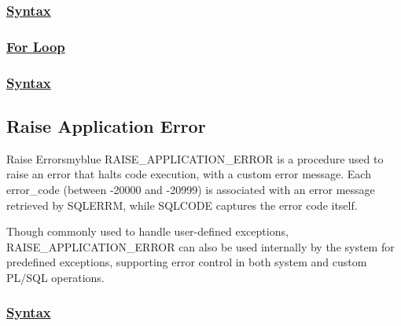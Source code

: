 \subsubsection*{\underline{Syntax}}





\vspace{0.25cm}



\subsubsection*{\underline{For Loop}}

\subsubsection*{\underline{Syntax}}




\vspace{0.5cm}

\subsection{Raise Application Error}
\begin{prettyBox}{Raise Errors}{myblue}
RAISE\_APPLICATION\_ERROR is a procedure used to raise an error that halts code execution, with a custom error
message. Each error\_code (between -20000 and -20999) is associated with an error message retrieved 
by SQLERRM, while SQLCODE captures the error code itself.

\vspace{0.25cm}




\vspace{0.25cm}


Though commonly used to handle user-defined exceptions, RAISE\_APPLICATION\_ERROR can also be used internally
by the system for predefined exceptions, supporting error control in both system and custom PL/SQL operations.
\end{prettyBox}

\newpage
\subsubsection*{\underline{Syntax}}





